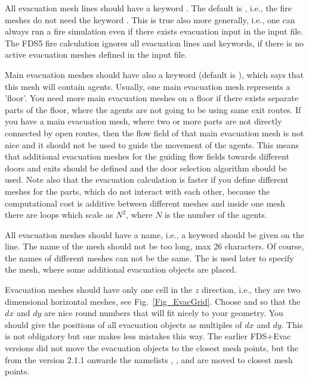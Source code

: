 \documentclass[12pt,a4paper,final,twoside]{stylevk}
\begin{document}
All evacuation mesh lines should have a keyword
.  The default is ,
i.e., the fire meshes do not need the keyword
.  This is true also more generally, i.e.,
one can always run a fire simulation even if there exists evacuation
input in the input file.  The FDS5 fire calculation ignores all
evacuation lines and keywords, if there is no active evacuation
meshes defined in the input file.

Main evacuation meshes should have also a keyword
 (default is ), which says
that this mesh will contain agents.  Usually, one main evacuation mesh
represents a 'floor'.  You need more main evacuation meshes on a floor
if there exists separate parts of the floor, where the agents are not
going to be using same exit routes.  If you have a main evacuation
mesh, where two or more parts are not directly connected by open
routes, then the flow field of that main evacuation mesh is not nice
and it should not be used to guide the movement of the agents.  This
means that additional evacuation meshes for the guiding flow fields
towards different doors and exits should be defined and the door
selection algorithm should be used.  Note also that the evacuation
calculation is faster if you define different meshes for the parts,
which do not interact with each other, because the computational cost
is additive between different meshes and inside one mesh there are
loops which scale as $N^2$, where $N $ is the number of the agents.


All evacuation meshes should have a name, i.e., a keyword
 should be given on the  line.  The name of
the mesh should not be too long, max 26 characters.  Of course, the
names of different meshes can not be the same.  The  is used
later to specify the mesh, where some additional evacuation objects
are placed.


Evacuation meshes should have only one cell in the $z$ direction,
i.e., they are two dimensional horizontal meshes, see
Fig.~\ref{Fig_EvacGrid}.  Choose  and  so that
the $dx$ and $dy$ are nice round numbers that will fit nicely to your
geometry.  You should give the positions of all evacuation objects as
multiples of $dx$ and $dy$.  This is not obligatory but one makes less
mistakes this way.  The earlier FDS+Evac versions did not move the
evacuation objects to the closest mesh points, but the from the
version 2.1.1 onwards the namelists , , and
 are moved to closest mesh points.
\end{document}
